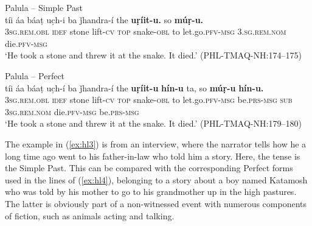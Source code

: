 \documentclass[output=paper]{langsci/langscibook}
\begin{document}
\begin{exe}
	\ex Palula -- Simple Past \label{ex:hl1}\\
	\gll tíi áa báaṭ uc̣h-i ba ǰhandra-í the \textbf{uṛíit-u.} so \textbf{múṛ-u.}\\
	{3\textsc{sg}.\textsc{rem}.\textsc{obl}} {\textsc{idef}} stone lift-\textsc{cv} \textsc{top} snake-\textsc{obl} to {let.go.\textsc{pfv}-\textsc{msg}} {3.\textsc{sg}.\textsc{rem}.\textsc{nom}} {die.\textsc{pfv}-\textsc{msg}}\\
	‘He took a stone and threw it at the snake. It died.’ (PHL-TMAQ-NH:174–175)
\end{exe}

\begin{exe}
	\ex\label{ex:hl2} Palula -- Perfect\\
	\gll tíi áa báaṭ uc̣h-í ba ǰhandra-í the \textbf{uṛíit-u} \textbf{hín-u} ta, so \textbf{múṛ-u} \textbf{hín-u.}\\
	{3\textsc{sg}.\textsc{rem}.\textsc{obl}} {\textsc{idef}} stone lift-\textsc{cv} \textsc{top} snake-\textsc{obl} to {let.go.\textsc{pfv}-\textsc{msg}} {be.\textsc{prs}-\textsc{msg}} \textsc{sub} {3\textsc{sg}.\textsc{rem}.\textsc{nom}} {die.\textsc{pfv}-\textsc{msg}} {be.\textsc{prs}-\textsc{msg}} \\
	‘He took a stone and threw it at the snake. It died.’ (PHL-TMAQ-NH:179–180)
\end{exe}

The example in ‎(\ref{ex:hl3}) is from an interview, where the narrator tells how he a long time ago went to his father-in-law who told him a story. Here, the tense is the Simple Past. This can be compared with the corresponding Perfect forms used in the lines of ‎(\ref{ex:hl4}), belonging to a story about a boy named Katamosh who was told by his mother to go to his grandmother up in the high pastures. The latter is obviously part of a non-witnessed event with numerous components of fiction, such as animals acting and talking.
\end{document}
